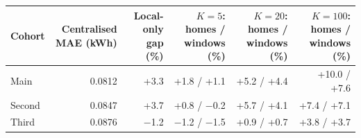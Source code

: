 \begin{tabular}{lrrrrr}
\toprule
Cohort & Centralised MAE (kWh) & Local-only gap (\%) & $K=5$: homes / windows (\%) & $K=20$: homes / windows (\%) & $K=100$: homes / windows (\%) \\
\midrule
Main & 0.0812 & +3.3 & +1.8 / +1.1 & +5.2 / +4.4 & +10.0 / +7.6 \\
Second & 0.0847 & +3.7 & +0.8 / −0.2 & +5.7 / +4.1 & +7.4 / +7.1 \\
Third & 0.0876 & −1.2 & −1.2 / −1.5 & +0.9 / +0.7 & +3.8 / +3.7 \\
\bottomrule
\end{tabular}
